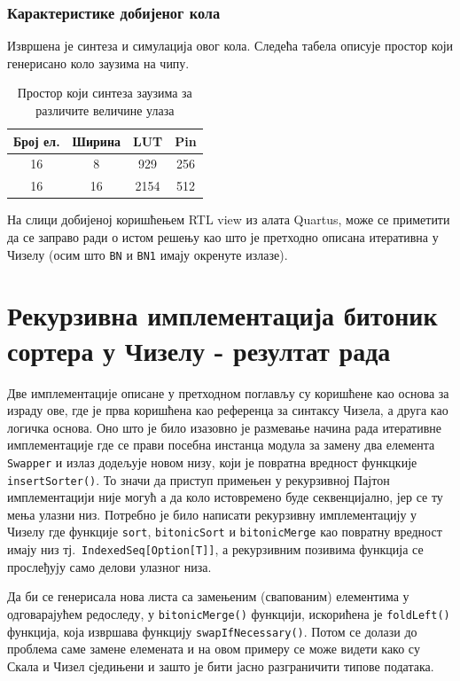 \documentclass[12pt, a4paper]{article}
\theoremstyle{definition}
\begin{document}
\subsubsection{Карактеристике добијеног кола}
Извршена је синтеза и симулација овог кола. Следећа табела описује простор који генерисано коло заузима на чипу.

\begin{table}[H]
\centering
 \begin{tabular}{| c | c | c c |}
  \hline
  Број ел. & Ширина & LUT & Pin \\
  \hline
  16 & 8  & 929 & 256 \\
  16 & 16 & 2154 & 512 \\
  \hline
 \end{tabular}
 \caption{Простор који синтеза заузима за различите величине улаза}
 \label{tab:cipSintezaVer1}
\end{table}

На слици добијеној коришћењем RTL view из алата Quartus, може се приметити да се заправо ради о истом решењу као што је претходно описана итеративна у Чизелу (осим што \verb+BN+ и \verb+BN1+ имају окренуте излазе).

\newpage
\section{Рекурзивна имплементација битоник сортера у Чизелу - резултат рада}

 Две имплементације описане у претходном поглављу су коришћене као основа за израду ове, где је прва коришћена као референца за синтаксу Чизела, а друга као логичка основа. Оно што је било изазовно је размевање начина рада итеративне имплементације где се прави посебна инстанца модула за замену два елемента \verb+Swapper+ и излаз додељује новом низу, који је повратна вредност функцкије \verb+insertSorter()+. То значи да приступ примењен у рекурзивној Пајтон имплементацији није могућ а да коло истовремено буде секвенцијално, јер се ту мења улазни низ. Потребно је било написати рекурзивну имплементацију у Чизелу где функције \verb+sort+, \verb+bitonicSort+ и \verb+bitonicMerge+ као повратну вредност имају низ тј.\ \verb+IndexedSeq[Option[T]]+, а рекурзивним позивима функција се прослеђују само делови улазног низа.

Да би се генерисала нова листа са замењеним (свапованим) елементима у одговарајућем редоследу, у \verb+bitonicMerge()+ функцији, искорићена је \verb+foldLeft()+ функција, која извршава функцију \verb+swapIfNecessary()+.
Потом се долази до проблема саме замене елемената и на овом примеру се може видети како су Скала и Чизел сједињени и зашто је бити јасно разграничити типове података.
\end{document}
